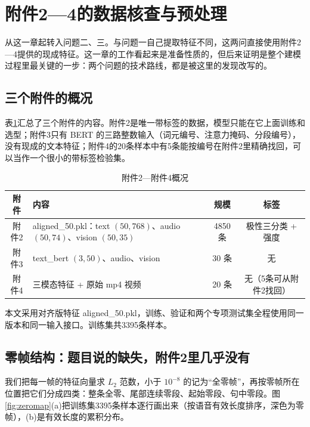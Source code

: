 \section{附件2—4的数据核查与预处理}\label{sec:data}

从这一章起转入问题二、三。与问题一自己提取特征不同，这两问直接使用附件2—4提供的现成特征。这一章的工作看起来是准备性质的，但后来证明是整个建模过程里最关键的一步：两个问题的技术路线，都是被这里的发现改写的。

\subsection{三个附件的概况}

表\ref{tab:attach}汇总了三个附件的内容。附件2是唯一带标签的数据，模型只能在它上面训练和选型；附件3只有 BERT 的三路整数输入（词元编号、注意力掩码、分段编号），没有现成的文本特征；附件4的20条样本中有5条能按编号在附件2里精确找回，可以当作一个很小的带标签检验集。

\begin{table}[htbp]
\centering
\caption{附件2—附件4概况}
\label{tab:attach}
\begin{tabularx}{\textwidth}{cXcc}
\toprule
附件 & 内容 & 规模 & 标签 \\
\midrule
附件2 & aligned\_50.pkl：text $(50,768)$、audio $(50,74)$、vision $(50,35)$ & 4850 条 & 极性三分类 + 强度 \\
附件3 & text\_bert $(3,50)$、audio、vision & 30 条 & 无 \\
附件4 & 三模态特征 + 原始 mp4 视频 & 20 条 & 无（5条可从附件2找回） \\
\bottomrule
\end{tabularx}
\end{table}

本文采用对齐版特征 aligned\_50.pkl，训练、验证和两个专项测试集全程使用同一版本和同一输入接口。训练集共3395条样本。

\subsection{零帧结构：题目说的缺失，附件2里几乎没有}\label{sec:zero}

我们把每一帧的特征向量求 $L_2$ 范数，小于 $10^{-8}$ 的记为“全零帧”，再按零帧所在位置把它们分成四类：整条全零、尾部连续零段、起始零段、句中零段。图\ref{fig:zeromap}(a)把训练集3395条样本逐行画出来（按语音有效长度排序，深色为零帧），(b)是有效长度的累积分布。

